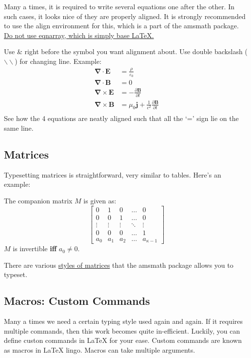 \documentclass{article}
\theoremstyle{remark}
\begin{document}
    Many a times, it is required to write several equations one after the other.
    In such cases, it looks nice of they are properly aligned. It is strongly recommended to use the align environment for this,
    which is a part of the amsmath package. \href{https://tex.stackexchange.com/questions/196/eqnarray-vs-align}{Do not use eqnarray, which is simply base \LaTeX.}

    Use \& right before the symbol you want alignment about. Use double backslash ($\backslash \backslash$) for changing line.
    Example: 
    \begin{align*}
        \boldsymbol{\nabla} \cdot \mathbf{E} &= \frac{\rho}{\varepsilon_0} \\
        \boldsymbol{\nabla} \cdot \mathbf{B} &= 0 \\
        \boldsymbol{\nabla} \times \mathbf{E} &= -\frac{\partial \mathbf{B}}{\partial t} \\
        \boldsymbol{\nabla} \times \mathbf{B} &= \mu_0\mathbf{j} + \frac{1}{c^2}\frac{\partial \mathbf{B}}{\partial t} \\
    \end{align*}
    See how the 4 equations are neatly aligned such that all the `=' sign lie on the same line.

    \subsection{Matrices}
    Typesetting matrices is straightforward, very similar to tables. Here's an example:

    The companion matrix $M$ is given as: \\
    $$\begin{bmatrix}
        0 & 1 & 0 & \dots & 0 \\
        0 & 0 & 1 & \dots & 0 \\
        \vdots & \vdots & \vdots & \ddots & \vdots \\
        0 & 0 & 0 & \dots & 1 \\
        a_0 & a_1 & a_2 & \dots & a_{\kappa-1}
    \end{bmatrix}$$
    $M$ is invertible \textbf{iff} $a_0 \neq 0$.

    There are various \href{https://www.overleaf.com/learn/latex/Matrices}{styles of matrices} that the amsmath package allows you to typeset.

\clearpage

    \subsection{Macros: Custom Commands}
    Many a times we need a certain typing style used again and again. If it requires multiple commands, then this work
    becomes quite in-efficient. Luckily, you can define custon commands in \LaTeX{} for your ease. Custom commands are known as macros in \LaTeX{} lingo.
    Macros can take multiple arguments.
\end{document}
